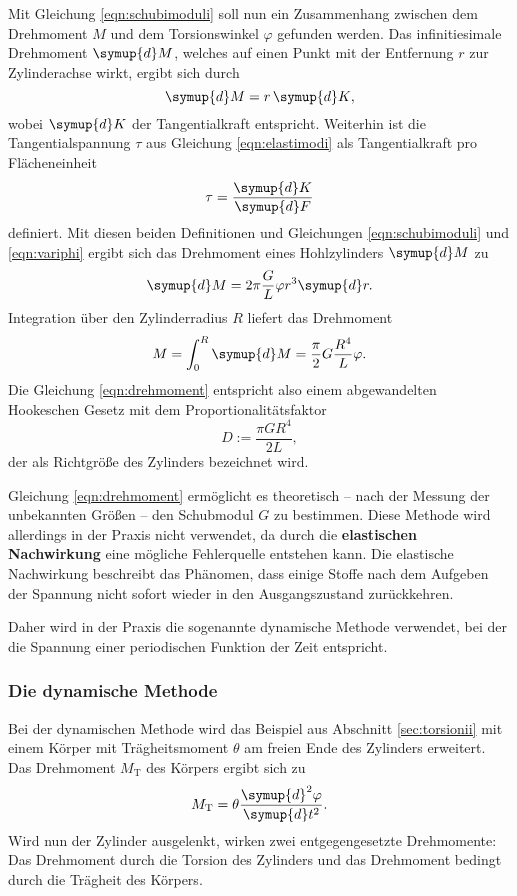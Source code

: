 Mit Gleichung \eqref{eqn:schubimoduli} soll nun ein Zusammenhang zwischen dem Drehmoment $M$ 
und dem Torsionswinkel $\varphi$ gefunden werden. 
Das infinitiesimale Drehmoment $\symup{d} M$, welches auf einen Punkt mit der Entfernung $r$ 
zur Zylinderachse wirkt, ergibt sich durch  
\begin{equation*}
	\symup{d} M = r \, \symup{d}K \mathrm{,}
\end{equation*}
wobei $\symup{d} K$ der Tangentialkraft entspricht.
Weiterhin ist die Tangentialspannung $\tau$ aus Gleichung \eqref{eqn:elastimodi} als 
Tangentialkraft pro Flächeneinheit 
\begin{equation*}
	\tau = \frac{\symup{d} K}{\symup{d} F}
\end{equation*}
definiert.
Mit diesen beiden Definitionen und Gleichungen \eqref{eqn:schubimoduli} und \eqref{eqn:variphi}
ergibt sich das Drehmoment eines Hohlzylinders $\symup{d} M$ zu 
\begin{equation}
	\symup{d} M = 2\pi \frac{G}{L} \varphi r^3 \symup{d}r \mathrm{.}
\end{equation}
Integration über den Zylinderradius $R$ liefert das Drehmoment
\begin{equation}
	\label{eqn:drehmoment}
	M = \int_0^R \symup{d} M = \frac{\pi}{2} G \frac{R^4}{L} \varphi \mathrm{.}
\end{equation}
Die Gleichung \eqref{eqn:drehmoment} entspricht also einem abgewandelten Hookeschen Gesetz 
mit dem Proportionalitätsfaktor 
\begin{equation}
	\label{eqn:richti}
	D := \frac{\pi G R^4}{2L} \mathrm{,}
\end{equation}
der als Richtgröße des Zylinders bezeichnet wird.

Gleichung \eqref{eqn:drehmoment} ermöglicht es theoretisch -- nach der Messung der unbekannten
Größen -- den Schubmodul $G$ zu bestimmen.
Diese Methode wird allerdings in der Praxis nicht verwendet, da durch die \textbf{elastischen
Nachwirkung} eine mögliche Fehlerquelle entstehen kann.
Die elastische Nachwirkung beschreibt das Phänomen, dass einige Stoffe nach dem Aufgeben der 
Spannung nicht sofort wieder in den Ausgangszustand zurückkehren.

Daher wird in der Praxis die sogenannte dynamische Methode verwendet, bei der die Spannung 
einer periodischen Funktion der Zeit entspricht.

\subsubsection{Die dynamische Methode}
\label{sec:dynamisch}
Bei der dynamischen Methode wird das Beispiel aus Abschnitt \ref{sec:torsionii} mit einem Körper
mit Trägheitsmoment $\theta$ am freien Ende des Zylinders erweitert.
Das Drehmoment $M_{\mathrm{T}}$  des Körpers ergibt sich zu 
\begin{equation}
	M_{\mathrm{T}} = \theta \frac{\symup{d}^2 \varphi}{\symup{d} t^2} \mathrm{.}
\end{equation}
Wird nun der Zylinder ausgelenkt, wirken zwei entgegengesetzte Drehmomente: Das Drehmoment 
durch die Torsion des Zylinders und das Drehmoment bedingt durch die Trägheit des Körpers.

